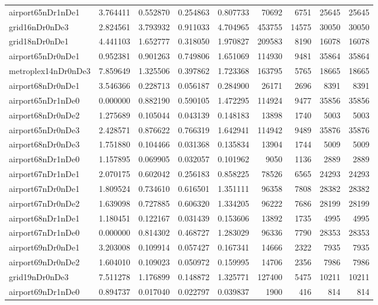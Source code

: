 \documentclass[../../../thesis.tex]{subfiles}
\begin{document}
\begin{longtable}{|l|r|r|r|r|r|r|r|r|}
airport65nDr1nDe1 & 3.764411 & 0.552870 & 0.254863 & 0.807733 & 70692 & 6751 & 25645 & 25645 \\
grid16nDr0nDe3 & 2.824561 & 3.793932 & 0.911033 & 4.704965 & 453755 & 14575 & 30050 & 30050 \\
grid18nDr0nDe1 & 4.441103 & 1.652777 & 0.318050 & 1.970827 & 209583 & 8190 & 16078 & 16078 \\
airport65nDr0nDe1 & 0.952381 & 0.901263 & 0.749806 & 1.651069 & 114930 & 9481 & 35864 & 35864 \\
metroplex14nDr0nDe3 & 7.859649 & 1.325506 & 0.397862 & 1.723368 & 163795 & 5765 & 18665 & 18665 \\
airport68nDr0nDe1 & 3.546366 & 0.228713 & 0.056187 & 0.284900 & 26171 & 2696 & 8391 & 8391 \\
airport65nDr1nDe0 & 0.000000 & 0.882190 & 0.590105 & 1.472295 & 114924 & 9477 & 35856 & 35856 \\
airport68nDr0nDe2 & 1.275689 & 0.105044 & 0.043139 & 0.148183 & 13898 & 1740 & 5003 & 5003 \\
airport65nDr0nDe3 & 2.428571 & 0.876622 & 0.766319 & 1.642941 & 114942 & 9489 & 35876 & 35876 \\
airport68nDr0nDe3 & 1.751880 & 0.104466 & 0.031368 & 0.135834 & 13904 & 1744 & 5009 & 5009 \\
airport68nDr1nDe0 & 1.157895 & 0.069905 & 0.032057 & 0.101962 & 9050 & 1136 & 2889 & 2889 \\
airport67nDr1nDe1 & 2.070175 & 0.602042 & 0.256183 & 0.858225 & 78526 & 6565 & 24293 & 24293 \\
airport67nDr0nDe1 & 1.809524 & 0.734610 & 0.616501 & 1.351111 & 96358 & 7808 & 28382 & 28382 \\
airport67nDr0nDe2 & 1.639098 & 0.727885 & 0.606320 & 1.334205 & 96222 & 7686 & 28199 & 28199 \\
airport68nDr1nDe1 & 1.180451 & 0.122167 & 0.031439 & 0.153606 & 13892 & 1735 & 4995 & 4995 \\
airport67nDr1nDe0 & 0.000000 & 0.814302 & 0.468727 & 1.283029 & 96336 & 7790 & 28353 & 28353 \\
airport69nDr0nDe1 & 3.203008 & 0.109914 & 0.057427 & 0.167341 & 14666 & 2322 & 7935 & 7935 \\
airport69nDr0nDe2 & 1.604010 & 0.109023 & 0.050972 & 0.159995 & 14706 & 2356 & 7986 & 7986 \\
grid19nDr0nDe3 & 7.511278 & 1.176899 & 0.148872 & 1.325771 & 127400 & 5475 & 10211 & 10211 \\
airport69nDr1nDe0 & 0.894737 & 0.017040 & 0.022797 & 0.039837 & 1900 & 416 & 814 & 814 \\

\end{longtable}
\end{document}
